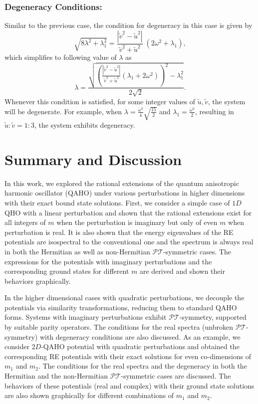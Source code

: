 \documentclass[a4paper, 12pt]{article}
\newcommand{\td}[1]{\tilde{#1}}
\begin{document}
\subsubsection*{Degeneracy Conditions:}

Similar to the previous case, the condition for degeneracy in this case is given by
\begin{equation}
  \sqrt{8\lambda^2+\lambda_1^2}=\frac{|\td{v}^2-\td{u}^2|}{\td{v}^2+\td{u}^2}\;(2\omega^2+\lambda_1),
\end{equation}
which simplifies to following value of $\lambda$ as
\begin{equation}
  \lambda=\frac{\sqrt{\left(\frac{|\td{v}^2-\td{u}^2|}{\td{v}^2+\td{u}^2}(\lambda_1+2\omega^2)\right)^2-\lambda_1^2}}{2 \sqrt{2}}.
\end{equation}
Whenever this condition is satisfied, for some integer values of $\td{u},\td{v}$, the system will be degenerate. For example, when \(\lambda = \frac{\omega^2}{4}\sqrt{\frac{15}{2}}\) and \(\lambda_1 = \frac{\omega^2}{2}\), resulting in \(\td{u} : \td{v} = 1 : 3\), the system exhibits degeneracy.

\section{Summary and Discussion}
In this work, we explored the rational extensions of the quantum anisotropic harmonic oscillator (QAHO) under various perturbations in higher dimensions with their exact bound state solutions. First, we consider a simple case of $1D$ QHO with a linear perturbation and shown that the rational extensions exist for all integers of \(m\)  when the perturbation is imaginary but only of even $m$ when perturbation is real. It is also shown that the energy eigenvalues of the RE potentials are isospectral to the conventional one and the spectrum is always real in both the Hermitian as well as non-Hermitian $\mathcal{PT}$-symmetric cases. The expressions for the potentials with imaginary perturbations and the corresponding ground states for different \(m\) are derived and shown their behaviors graphically.

In the higher dimensional cases with quadratic perturbations, we decouple the potentials via similarity transformations, reducing them to standard QAHO forms. Systems with imaginary perturbations exhibit $\mathcal{PT}$-symmetry, supported by suitable parity operators. The conditions for the real spectra (unbroken $\mathcal{PT}$-symmetry) with degeneracy conditions are also discussed. As an example, we consider $2D$-QAHO potential with quadratic perturbations and obtained the corresponding RE potentials with their exact solutions for even co-dimensions of $m_1$ and $m_2$. The conditions for the real spectra and the degeneracy in both the Hermitian and the non-Hermitian $\mathcal{PT}$-symmetric cases are discussed. The behaviors of these potentials (real and complex) with their ground state solutions are also shown graphically for different combinations of $m_1$ and $m_2$.  
\end{document}
